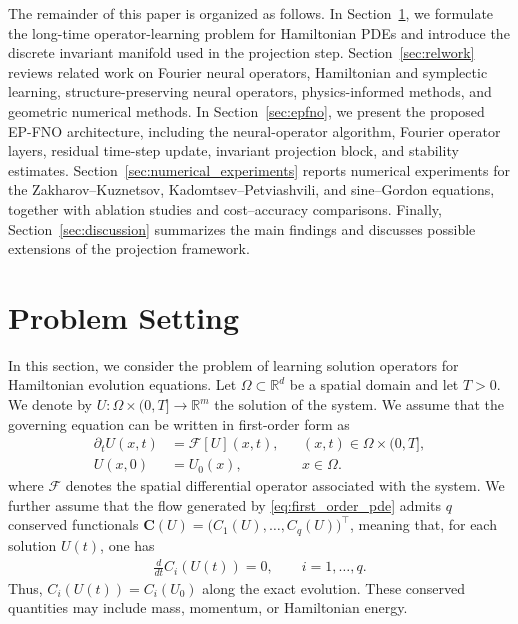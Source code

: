 \documentclass[11pt,a4paper]{article}
\theoremstyle{definition}
\theoremstyle{remark}
\numberwithin{equation}{section}
\numberwithin{figure}{section}
\numberwithin{table}{section}
\begin{document}
The remainder of this paper is organized as follows. 
In Section~\ref{sec:problem_setting}, we formulate the long-time operator-learning problem for Hamiltonian PDEs and introduce the discrete invariant manifold used in the projection step. Section~\ref{sec:relwork} reviews related work on Fourier neural operators, Hamiltonian and symplectic learning, structure-preserving neural operators, physics-informed methods, and geometric numerical methods. 
In Section~\ref{sec:epfno}, we present the proposed EP-FNO architecture, including the neural-operator algorithm, Fourier operator layers, residual time-step update, invariant projection block, and stability estimates. Section~\ref{sec:numerical_experiments} reports numerical experiments for the Zakharov--Kuznetsov, Kadomtsev--Petviashvili, and sine--Gordon equations, together with ablation studies and cost--accuracy comparisons. Finally, Section~\ref{sec:discussion} summarizes the main findings and discusses possible extensions of the projection framework.


\section{Problem Setting}
\label{sec:problem_setting}
In this section, we consider the problem of learning solution operators for Hamiltonian evolution equations. Let \(\Omega\subset\mathbb{R}^d\) be a spatial domain and let $T>0$. We denote by \(U:\Omega\times(0,T]\to\mathbb{R}^m\) the solution of the system.  We assume that the governing equation can be written in first-order form as
\begin{equation}
\label{eq:first_order_pde}
\begin{aligned}
\partial_t U(x,t) &= \mathcal F[U](x,t),
&& (x,t)\in \Omega\times(0,T],\\
U(x,0) &= U_0(x),
&& x\in\Omega.
\end{aligned}
\end{equation}
where \(\mathcal F\) denotes the spatial differential operator associated with the system. We further assume that the flow generated by \eqref{eq:first_order_pde} admits \(q\) conserved functionals $\mathbf C(U)=\big(C_1(U),\ldots,C_q(U)\big)^\top$, meaning that, for each solution \(U(t)\), one has 
\begin{align}\label{derivative}
    \frac{d}{dt}C_i(U(t))=0, \qquad i=1,\ldots,q.
\end{align}
Thus, \(C_i(U(t))=C_i(U_0)\) along the exact evolution. These conserved
quantities may include mass, momentum, or Hamiltonian energy.
\end{document}

